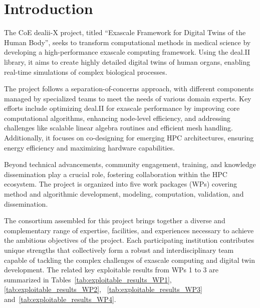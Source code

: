 \documentclass[a4paper,12pt]{article}
\begin{document}
\vspace*{2cm}

\disclaimer

\newpage

\tableofcontents %

\newpage

\section{{Introduction}} \label{sec:introduction}

The CoE dealii-X project, titled ``Exascale Framework for Digital Twins of the Human Body'', seeks to transform computational methods in medical science by developing a high-performance exascale computing framework. Using the deal.II library, it aims to create highly detailed digital twins of human organs, enabling real-time simulations of complex biological processes.

The project follows a separation-of-concerns approach, with different components managed by specialized teams to meet the needs of various domain experts. Key efforts include optimizing deal.II for exascale performance by improving core computational algorithms, enhancing node-level efficiency, and addressing challenges like scalable linear algebra routines and efficient mesh handling. Additionally, it focuses on co-designing for emerging HPC architectures, ensuring energy efficiency and maximizing hardware capabilities.

Beyond technical advancements, community engagement, training, and knowledge dissemination play a crucial role, fostering collaboration within the HPC ecosystem. The project is organized into five work packages (WPs) covering method and algorithmic development, modeling, computation, validation, and dissemination.

The consortium assembled for this project brings together a diverse and complementary range of expertise, facilities, and experiences necessary to achieve the ambitious objectives of the project. Each participating institution contributes unique strengths that collectively form a robust and interdisciplinary team capable of tackling the complex challenges of exascale computing and digital twin development. The related key exploitable results from WPs 1 to 3 are summarized in Tables~\ref{tab:exploitable_results_WP1}, \ref{tab:exploitable_results_WP2}, ~\ref{tab:exploitable_results_WP3} and~\ref{tab:exploitable_results_WP4}.
\end{document}
